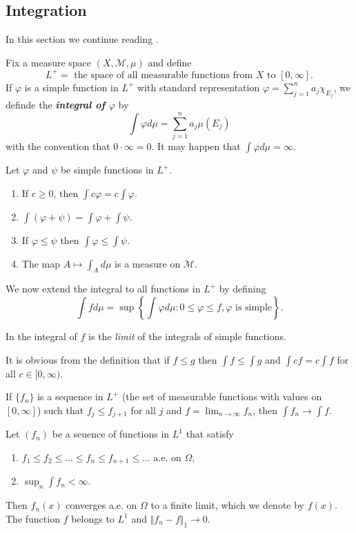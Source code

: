\documentclass{article}
\theoremstyle{definition}
\numberwithin{equation}{section}
\begin{document}
	\subsection{Integration}
	In this section we continue reading \cite{folland}.
	
	Fix a measure space $(X,\mathcal{M},\mu)$ and define
	\[L^+=\text{ the space of all measurable functions from }X\text{ to }[0,\infty].\]
	If $\varphi$ is a simple function in $L^+$ with standard representation $\varphi=\sum_{j=1}^na_j\chi_{E_j}$, we definde the \textbf{\textit{integral of $\varphi$}} by
	\[\int\varphi d\mu=\sum_{j=1}^n a_j\mu(E_j)\]
	with the convention that $0\cdot\infty=0$. It may happen that $\int\varphi d\mu=\infty$.
	
	\begin{prop}Let $\varphi$ and $\psi$ be simple functions in $L^+$.
		\begin{enumerate}
			\item If $c\geq0$, then $\int c\varphi=c\int\varphi$.
			\item $\int(\varphi+\psi)=\int\varphi+\int\psi$.
			\item If $\varphi\leq\psi$ then $\int\varphi\leq\int\psi$.
			\item The map $A\mapsto\int_Ad\mu$ is a measure on $\mathcal{M}$.
		\end{enumerate}
	\end{prop}
	We now extend the integral to all functions in $L^+$ by defining
	\[\int fd\mu=\sup\left\{\int\varphi d\mu:0\leq\varphi\leq f,\varphi\text{ is simple}\right\}.\]
	\begin{remark}
		In \cite{riesz} the integral of $f$ is the \textit{limit} of the integrals of simple functions.
	\end{remark}
	\begin{remark}
		It is obvious from the definition that if $f\leq g$ then $\int f\leq\int g$ and $\int cf=c\int f$ for all $c\in[0,\infty)$.
	\end{remark}
	\begin{thm}
		If $\{f_n\}$ is a sequence in $L^+$ (the set of measurable functions with values on $[0,\infty]$) such that $f_j\leq f_{j+1}$ for all $j$ and $f=\lim_{n\to\infty}f_n$, then $\int f_n\to\int f$.
	\end{thm}
	\begin{thm}
		Let $(f_n)$ be a seuence of functions in $L^1$ that satisfy
		\begin{enumerate}
			\item $f_1\leq f_2\leq\ldots\leq f_n\leq f_{n+1}\leq\ldots$ a.e. on $\Omega$,
			\item $\sup_n\int f_n<\infty$.
		\end{enumerate}
		Then $f_n(x)$ converges a.e. on $\Omega$ to a finite limit, which we denote by $f(x)$. The function $f$ belongs to $L^1$ and $\Vert f_n-f\Vert_1\to0$.
	\end{thm}
\end{document}
